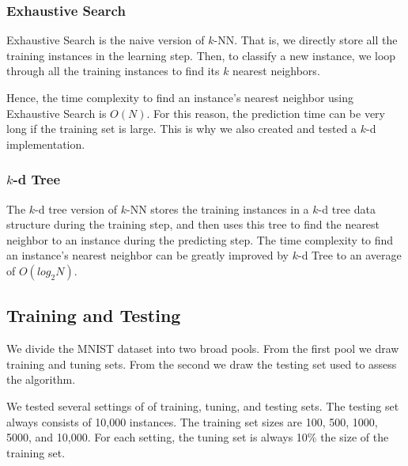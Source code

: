 \subsubsection{Exhaustive Search}
Exhaustive Search is the naive version of $k$-NN. That is, we directly store all the training instances in the learning step. Then, to classify a new instance, we loop through all the training instances to find its $k$ nearest neighbors.

 Hence, the time complexity to find an instance's nearest neighbor using Exhaustive Search is $O(N)$. For this reason, the prediction time can be very long if the training set is large. This is why we also created and tested a $k$-d implementation.

\subsubsection{$k$-d Tree}
The $k$-d tree version of $k$-NN stores the training instances in a $k$-d tree data structure during the training step, and then uses this tree to find the nearest neighbor to an instance during the predicting step. The time complexity to find an instance's nearest neighbor can be greatly improved by $k$-d Tree to an average of $O(log_2N)$. 

\subsection{Training and Testing}

We divide the MNIST dataset into two broad pools.  From the first pool we draw training and tuning sets.  From the second we draw the testing set used to assess the algorithm.

We tested several settings of of training, tuning, and testing sets.  The testing set always consists of 10,000 instances.  The training set sizes are 100, 500, 1000, 5000, and 10,000. For each setting, the tuning set is always 10\% the size of the training set.